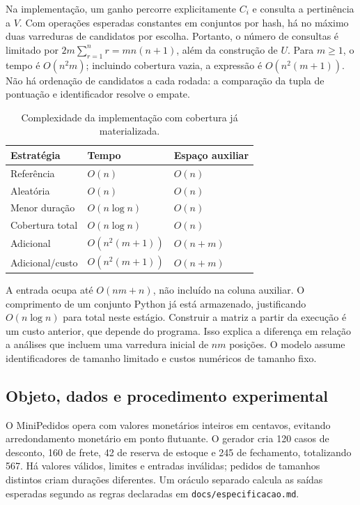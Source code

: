 \documentclass[12pt]{article}
\begin{document}
Na implementação, um ganho percorre explicitamente $C_i$ e consulta a pertinência a $V$. Com operações esperadas constantes em conjuntos por hash, há no máximo duas varreduras de candidatos por escolha. Portanto, o número de consultas é limitado por $2m\sum_{r=1}^{n}r=mn(n+1)$, além da construção de $U$. Para $m\geq1$, o tempo é $O(n^2m)$; incluindo cobertura vazia, a expressão é $O(n^2(m+1))$. Não há ordenação de candidatos a cada rodada: a comparação da tupla de pontuação e identificador resolve o empate.

\begin{table}[ht]
\centering\caption{Complexidade da implementação com cobertura já materializada.}\label{tab:complex}
\begin{tabular}{lll}\toprule
Estratégia & Tempo & Espaço auxiliar\\\midrule
Referência & $O(n)$ & $O(n)$\\
Aleatória & $O(n)$ & $O(n)$\\
Menor duração & $O(n\log n)$ & $O(n)$\\
Cobertura total & $O(n\log n)$ & $O(n)$\\
Adicional & $O(n^2(m+1))$ & $O(n+m)$\\
Adicional/custo & $O(n^2(m+1))$ & $O(n+m)$\\\bottomrule
\end{tabular}
\end{table}

A entrada ocupa até $O(nm+n)$, não incluído na coluna auxiliar. O comprimento de um conjunto Python já está armazenado, justificando $O(n\log n)$ para total neste estágio. Construir a matriz a partir da execução é um custo anterior, que depende do programa. Isso explica a diferença em relação a análises que incluem uma varredura inicial de $nm$ posições. O modelo assume identificadores de tamanho limitado e custos numéricos de tamanho fixo.
\subsection{Objeto, dados e procedimento experimental}
O MiniPedidos opera com valores monetários inteiros em centavos, evitando arredondamento monetário em ponto flutuante. O gerador cria 120 casos de desconto, 160 de frete, 42 de reserva de estoque e 245 de fechamento, totalizando 567. Há valores válidos, limites e entradas inválidas; pedidos de tamanhos distintos criam durações diferentes. Um oráculo separado calcula as saídas esperadas segundo as regras declaradas em \texttt{docs/especificacao.md}.
\end{document}
